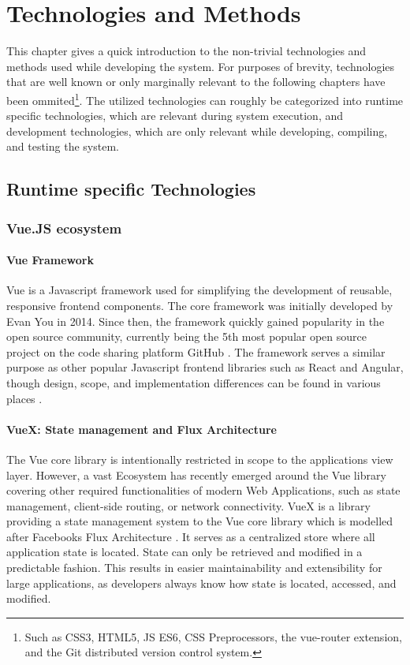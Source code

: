\chapter{Technologies and Methods}
\label{sec:tech_and_methods}
This chapter gives a quick introduction to the non-trivial technologies and methods used while developing the system. For purposes of brevity, technologies that are well known or only marginally relevant to the following chapters have been ommited\footnote{Such as CSS3, HTML5, JS ES6, CSS Preprocessors, the vue-router extension, and the Git distributed version control system.}. The utilized technologies can roughly be categorized into runtime specific technologies, which are relevant during system execution, and development technologies, which are only relevant while developing, compiling, and testing the system. 
\section{Runtime specific Technologies}
\subsection{Vue.JS ecosystem}
\subsubsection{Vue Framework}
Vue is a Javascript framework used for simplifying the development of reusable, responsive frontend components. The core framework was initially developed by Evan You in 2014. Since then, the framework quickly gained popularity in the open source community, currently being the 5th most popular open source project on the code sharing platform GitHub \cite{GitHubMostStars}. The framework serves a similar purpose as other popular Javascript frontend libraries such as React and Angular, though design, scope, and implementation differences can be found in various places \cite{VueComparisonOtherFrameworks}.
\subsubsection{VueX: State management and Flux Architecture}
The Vue core library is intentionally restricted in scope to the applications view layer. However, a vast Ecosystem has recently emerged around the Vue library covering other required functionalities of modern Web Applications, such as state management, client-side routing, or network connectivity. VueX is a library providing a state management system to the Vue core library which is modelled after Facebooks Flux Architecture \cite{Vuex}\cite{FacebookFlux}. It serves as a centralized store where all application state is located. State can only be retrieved and modified in a predictable fashion. This results in easier maintainability and extensibility for large applications, as developers always know how state is located, accessed, and modified.
